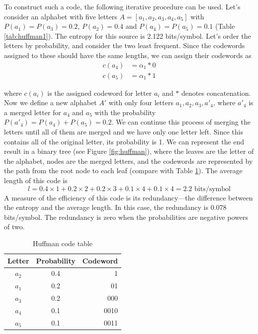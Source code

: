 \documentclass{diploma_style}
\begin{document}
To construct such a code, the following iterative procedure can be used. Let's consider an alphabet with five letters $A = [a_1,a_2,a_3,a_4,a_5]$ with $P(a_1)=P(a_3)=0.2$, $P(a_2)=0.4$ and $P(a_4)=P(a_5)=0.1$ (Table \ref{tab:huffman1}). The entropy for this source is 2.122 bits/symbol. Let's order the letters by probability, and consider the two least frequent. Since the codewords assigned to these should have the same lengths, we can assign their codewords as
\begin{align*}
c(a_4) &= \alpha_1 * 0 \\
c(a_5) &= \alpha_1 *1
\end{align*}

where $c(a_i)$ is the assigned codeword for letter $a_i$ and $*$ denotes concatenation. Now we define a new alphabet $A'$ with only four letters $a_1, a_2, a_3, a'_4$, where $a'_4$ is a merged letter for $a_4$ and $a_5$ with the probability $P(a'_4) = P(a_4) + P(a_5) = 0.2$. We can continue this process of merging the letters until all of them are merged and we have only one letter left. Since this contains all of the original letter, its probability is 1. We can represent the end result in a binary tree (see Figure \ref{fig:huffman}), where the leaves are the letter of the alphabet, nodes are the merged letters, and the codewords are represented by the path from the root node to each leaf (compare with Table \ref{tab:huffman2}). The average length of this code is
\begin{equation}
l = 0.4\times 1 + 0.2 \times 2 + 0.2 \times 3 + 0.1 \times 4 + 0.1 \times 4 = 2.2 \text{ bits/symbol}
\end{equation}
A measure of the efficiency of this code is its redundancy—the difference between the entropy
and the average length. In this case, the redundancy is 0.078 bits/symbol. The redundancy is
zero when the probabilities are negative powers of two.

\begin{table}
\caption{Huffman code table}
\centering
\begin{tabular}{ccr}
\toprule
Letter & Probability & Codeword \\
\midrule
$a_2$ & 0.4 & 1 \\
$a_1$ & 0.2 & 01 \\
$a_3$ & 0.2 & 000 \\
$a_4$ & 0.1 & 0010 \\
$a_5$ & 0.1 & 0011 \\
\bottomrule
\end{tabular}
\label{tab:huffman2}
\end{table}
\end{document}
